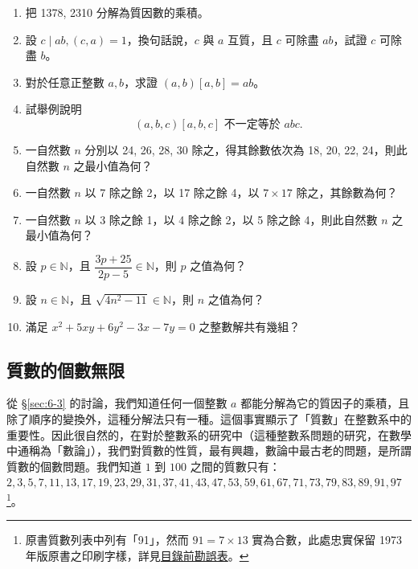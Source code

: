 \begin{enumerate}[1.]
  \item 把 1378, 2310 分解為質因數的乘積。

  \item 設 $c \mid ab, (c, a) = 1$，換句話說，$c$ 與 $a$ 互質，且 $c$ 可除盡 $ab$，試證 $c$ 可除盡 $b$。

  \item 對於任意正整數 $a, b$，求證 $(a, b)[a, b] = ab$。

  \item 試舉例說明
  \begin{equation*}
    (a, b, c)[a, b, c] \text{ 不一定等於 } abc.
  \end{equation*}

  \item 一自然數 $n$ 分別以 24, 26, 28, 30 除之，得其餘數依次為 18, 20, 22, 24，則此自然數 $n$ 之最小值為何？

  \item 一自然數 $n$ 以 7 除之餘 2，以 17 除之餘 4，以 $7 \times 17$ 除之，其餘數為何？

  \item 一自然數 $n$ 以 3 除之餘 1，以 4 除之餘 2，以 5 除之餘 4，則此自然數 $n$ 之最小值為何？

  \item 設 $p \in \mathbb{N}$，且 $\dfrac{3p+25}{2p-5} \in \mathbb{N}$，則 $p$ 之值為何？

  \item 設 $n \in \mathbb{N}$，且 $\sqrt{4n^2-11} \in \mathbb{N}$，則 $n$ 之值為何？

  \item 滿足 $x^2 + 5xy + 6y^2 - 3x - 7y = 0$ 之整數解共有幾組？
\end{enumerate}

\subsection{質數的個數無限}\label{sec:6-4}

從 \S\ref{sec:6-3} 的討論，我們知道任何一個整數 $a$ 都能分解為它的質因子的乘積，且除了順序的變換外，這種分解法只有一種。這個事實顯示了「質數」在整數系中的重要性。因此很自然的，在對於整數系的研究中（這種整數系問題的研究，在數學中通稱為「數論」），我們對質數的性質，最有興趣，數論中最古老的問題，是所謂質數的個數問題。我們知道 $1$ 到 $100$ 之間的質數只有：$2, 3, 5, 7, 11, 13, 17, 19, 23, 29, 31, 37, 41, 43, 47, 53, 59, 61, 67, 71, 73, 79, 83, 89, 91, 97$\footnote{原書質數列表中列有「91」，然而 $91 = 7 \times 13$ 實為合數，此處忠實保留 1973 年版原書之印刷字樣，詳見\hyperref[sec:master_errata_notes]{目錄前勘誤表}。}\label{note:ch6-prime91}。

